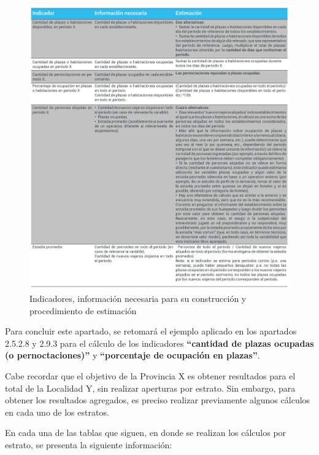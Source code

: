 \documentclass[
]{book}
\begin{document}
\begin{figure}

{\centering \includegraphics[width=1\linewidth]{imagenes/tabla_8} 

}

\caption{Indicadores, información necesaria para su construcción y procedimiento de estimación}\label{fig:indicadores}
\end{figure}

Para concluir este apartado, se retomará el ejemplo aplicado en los apartados 2.5.2.8 y 2.9.3 para el cálculo de los indicadores \textbf{``cantidad de plazas ocupadas (o pernoctaciones)''} y \textbf{``porcentaje de ocupación en plazas''}.

Cabe recordar que el objetivo de la Provincia X es obtener resultados para el total de la Localidad Y, sin realizar aperturas por estrato. Sin embargo, para obtener los resultados agregados, es preciso realizar previamente algunos cálculos en cada uno de los estratos.

En cada una de las tablas que siguen, en donde se realizan los cálculos por estrato, se presenta la siguiente información:
\end{document}

